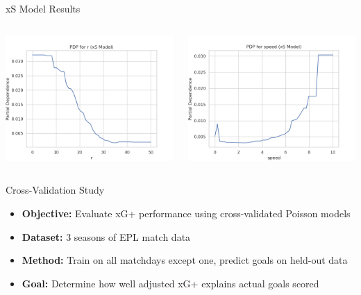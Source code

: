 \documentclass{beamer}
\begin{document}
\begin{frame}{xS Model Results}
\begin{columns}[c]
  \includegraphics[width=\linewidth]{figures/xS_PDP_r.png}

  \includegraphics[width=\linewidth]{figures/xS_PDP_speed.png}
\end{columns}
\end{frame}

\begin{frame}{Cross-Validation Study}
\begin{itemize}
\item \textbf{Objective:} Evaluate xG+ performance using cross-validated Poisson models
\item \textbf{Dataset:} 3 seasons of EPL match data
\item \textbf{Method:} Train on all matchdays except one, predict goals on held-out data
\item \textbf{Goal:} Determine how well adjusted xG+ explains actual goals scored
\end{itemize}
\end{frame}
\end{document}
